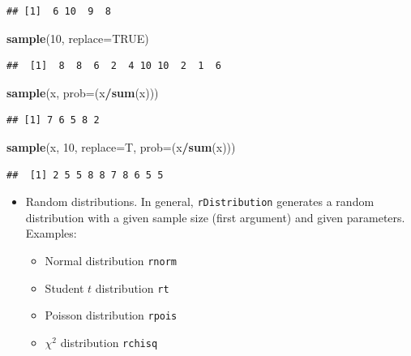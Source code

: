 \documentclass[
]{article}
\newenvironment{Shaded}{\begin{snugshade}}{\end{snugshade}}
\newcommand{\DataTypeTok}[1]{\textcolor[rgb]{0.13,0.29,0.53}{#1}}
\newcommand{\DecValTok}[1]{\textcolor[rgb]{0.00,0.00,0.81}{#1}}
\newcommand{\KeywordTok}[1]{\textcolor[rgb]{0.13,0.29,0.53}{\textbf{#1}}}
\newcommand{\NormalTok}[1]{#1}
\newcommand{\OperatorTok}[1]{\textcolor[rgb]{0.81,0.36,0.00}{\textbf{#1}}}
\newcommand{\OtherTok}[1]{\textcolor[rgb]{0.56,0.35,0.01}{#1}}
\providecommand{\tightlist}{%
  \setlength{\itemsep}{0pt}\setlength{\parskip}{0pt}}
\begin{document}
\begin{verbatim}
## [1]  6 10  9  8
\end{verbatim}

\begin{Shaded}
\begin{Highlighting}[]
\KeywordTok{sample}\NormalTok{(}\DecValTok{10}\NormalTok{, }\DataTypeTok{replace=}\OtherTok{TRUE}\NormalTok{)}
\end{Highlighting}
\end{Shaded}

\begin{verbatim}
##  [1]  8  8  6  2  4 10 10  2  1  6
\end{verbatim}

\begin{Shaded}
\begin{Highlighting}[]
\KeywordTok{sample}\NormalTok{(x, }\DataTypeTok{prob=}\NormalTok{(x}\OperatorTok{/}\KeywordTok{sum}\NormalTok{(x)))}
\end{Highlighting}
\end{Shaded}

\begin{verbatim}
## [1] 7 6 5 8 2
\end{verbatim}

\begin{Shaded}
\begin{Highlighting}[]
\KeywordTok{sample}\NormalTok{(x, }\DecValTok{10}\NormalTok{, }\DataTypeTok{replace=}\NormalTok{T, }\DataTypeTok{prob=}\NormalTok{(x}\OperatorTok{/}\KeywordTok{sum}\NormalTok{(x)))}
\end{Highlighting}
\end{Shaded}

\begin{verbatim}
##  [1] 2 5 5 8 8 7 8 6 5 5
\end{verbatim}

\begin{itemize}
\tightlist
\item
  Random distributions. In general, \texttt{rDistribution} generates a
  random distribution with a given sample size (first argument) and
  given parameters. Examples:

  \begin{itemize}
  \tightlist
  \item
    Normal distribution \texttt{rnorm}
  \item
    Student \(t\) distribution \texttt{rt}
  \item
    Poisson distribution \texttt{rpois}
  \item
    \(\chi ^2\) distribution \texttt{rchisq}
  \end{itemize}
\end{itemize}
\end{document}
